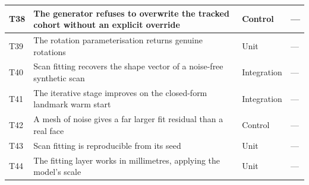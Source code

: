 {\begin{longtable}{|P{0.9cm}|P{9.3cm}|P{1.9cm}|P{1.9cm}|}
T38 & The generator refuses to overwrite the tracked cohort without an explicit override & Control & --- \\ \hline
T39 & The rotation parameterisation returns genuine rotations & Unit & --- \\ \hline
T40 & Scan fitting recovers the shape vector of a noise-free synthetic scan & Integration & --- \\ \hline
T41 & The iterative stage improves on the closed-form landmark warm start & Integration & --- \\ \hline
T42 & A mesh of noise gives a far larger fit residual than a real face & Control & --- \\ \hline
T43 & Scan fitting is reproducible from its seed & Unit & --- \\ \hline
T44 & The fitting layer works in millimetres, applying the model's scale & Unit & --- \\ \hline
\end{longtable}
}
